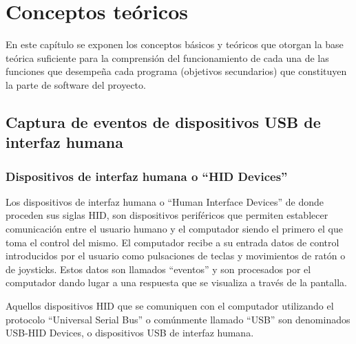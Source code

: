 \chapter{Conceptos teóricos} \label{cap2}

En este capítulo se exponen los conceptos básicos y teóricos que otorgan la base teórica suficiente para la comprensión del funcionamiento de cada una de las funciones que desempeña cada programa (objetivos secundarios) que constituyen la parte de software del proyecto.

\newpage



\section{Captura de eventos de dispositivos USB de interfaz humana} \label{s2_1}

\subsection{Dispositivos de interfaz humana o ``HID Devices''} \label{s2_1_1}

Los dispositivos de interfaz humana o ``Human Interface Devices'' de donde proceden sus siglas HID, son dispositivos periféricos que permiten establecer comunicación entre el usuario humano y el computador siendo el primero el que toma el control del mismo. El computador recibe a su entrada datos de control introducidos por el usuario como pulsaciones de teclas y movimientos de ratón o de joysticks. Estos datos son llamados ``eventos'' y son procesados por el computador dando lugar a una respuesta que se visualiza a través de la pantalla. 

Aquellos dispositivos HID que se comuniquen con el computador utilizando el protocolo ``Universal Serial Bus'' o comúnmente llamado ``USB'' son denominados USB-HID Devices, o dispositivos USB de interfaz humana. 

